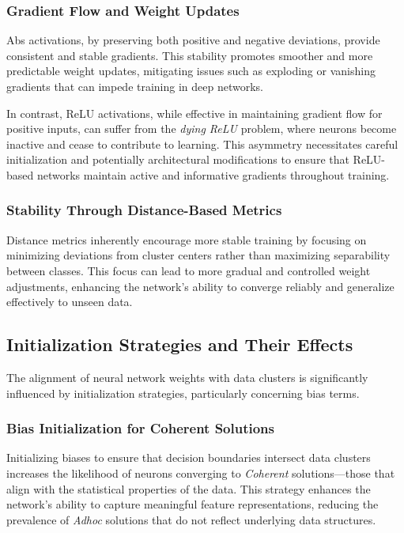 \subsubsection{Gradient Flow and Weight Updates}

Abs activations, by preserving both positive and negative deviations, provide consistent and stable gradients. This stability promotes smoother and more predictable weight updates, mitigating issues such as exploding or vanishing gradients that can impede training in deep networks.

In contrast, ReLU activations, while effective in maintaining gradient flow for positive inputs, can suffer from the \textit{dying ReLU} problem, where neurons become inactive and cease to contribute to learning. This asymmetry necessitates careful initialization and potentially architectural modifications to ensure that ReLU-based networks maintain active and informative gradients throughout training.

\subsubsection{Stability Through Distance-Based Metrics}

Distance metrics inherently encourage more stable training by focusing on minimizing deviations from cluster centers rather than maximizing separability between classes. This focus can lead to more gradual and controlled weight adjustments, enhancing the network's ability to converge reliably and generalize effectively to unseen data.

\subsection{Initialization Strategies and Their Effects}

The alignment of neural network weights with data clusters is significantly influenced by initialization strategies, particularly concerning bias terms.

\subsubsection{Bias Initialization for Coherent Solutions}

Initializing biases to ensure that decision boundaries intersect data clusters increases the likelihood of neurons converging to \textit{Coherent} solutions—those that align with the statistical properties of the data. This strategy enhances the network's ability to capture meaningful feature representations, reducing the prevalence of \textit{Adhoc} solutions that do not reflect underlying data structures.

